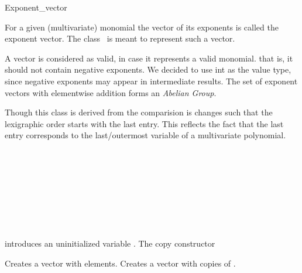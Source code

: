 \begin{ccRefClass}{Exponent_vector}

\ccDefinition

For a given (multivariate) monomial the vector of its exponents is called the 
exponent vector. The class \ccClassName\ is meant to represent 
such a vector.

A vector is considered as valid, in case it represents a valid monomial. 
that is, it should not contain negative exponents. 
We decided to use int as the value type, 
since negative exponents may appear in intermediate results.
The set of exponent vectors with elementwise 
addition forms an {\em Abelian Group}. 

Though this class is derived from  the comparision
is changes such that the lexigraphic order starts with the last entry. 
This reflects the fact that the last entry corresponds 
to the last/outermost variable of a multivariate polynomial. 




\ccInheritsFrom
{}

\ccIsModel

\\
\\

\\
\\
\\

\\
\\

\ccCreation
{}

        {introduces an uninitialized variable \ccVar.
        }\ccGlue
        {The copy constructor
        }\ccGlue

        {Creates a vector with  elements.
        }\ccGlue
{} 
        {Creates a vector with  copies of . 
        }\ccGlue


\end{ccRefClass}
